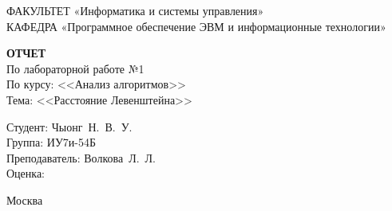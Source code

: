 \begin{titlepage}
	{\doublespacing \small \raggedright ФАКУЛЬТЕТ \hspace{25mm} «Информатика и системы управления»\\
		КАФЕДРА \hspace{5mm} «Программное обеспечение ЭВМ и информационные технологии»\\}
	
	\vspace{30mm}
	
	\textbf{ОТЧЕТ}\\
	По лабораторной работе №1\\
	По курсу: <<Анализ алгоритмов>>\\
	Тема: <<Расстояние Левенштейна>>\\
	
	\vspace{60mm}
	
	\hspace{70mm} Студент:       \hfill Чыонг~Н.~В.~У.\\
	\hspace{70mm} Группа:        \hfill ИУ7и-54Б\\
	\hspace{70mm} Преподаватель: \hfill Волкова~Л.~Л.\\
	\hspace{70mm} Оценка:        \hfill \hrulefill\\
	
	\vfill
	
	Москва\\
	\the\year
\end{titlepage}

\setcounter{page}{2}